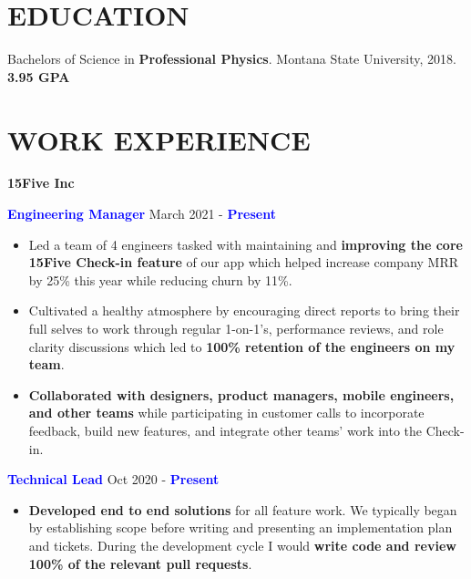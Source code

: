 \documentclass[11pt]{resume}
\begin{document}
    \vspace{-1em}
    \noindent\begin{minipage}[t]{1\textwidth}
      {\section* {\large{EDUCATION}}}
      Bachelors of Science in {\bf Professional Physics}. Montana State University,
      2018.
      {\bf 3.95 GPA}

      {\section* {\large{WORK EXPERIENCE}}}
      \vspace{-.25em}
      {\bf 15Five Inc}
      \vspace{.25em}
      \begin{addmargin}[.5em]{0em}
        {\bf \textcolor{blue}{Engineering Manager}} {\hfill March 2021 - {\bf \textcolor{blue}{Present}}}
        \vspace{-.5em}
        \begin{itemize}
            \setlength\itemsep{-.2em}
            \item {Led a team of 4 engineers tasked with maintaining and {\bf
                  improving the core 15Five Check-in feature} of our app which
                  helped increase company MRR by 25\% this year while reducing churn
                  by 11\%.}
            \item {Cultivated a healthy atmosphere by encouraging direct
                  reports to bring their full selves to work through regular
                  1-on-1's, performance reviews, and role clarity discussions
                  which led to {\bf 100\% retention of the engineers on my team}.}
            \item {{\bf Collaborated with designers, product managers, mobile
                  engineers, and other teams} while participating in customer calls
                  to incorporate feedback, build new features, and integrate other
                  teams' work into the Check-in.}
        \end{itemize}

        {\bf \textcolor{blue}{Technical Lead}} {\hfill Oct 2020 - {\bf \textcolor{blue}{Present}}}
        \vspace{-.5em}
        \begin{itemize}
            \setlength\itemsep{-.2em}
            \item {{\bf Developed end to end solutions} for all feature work. We
                  typically began by establishing scope before writing and
                  presenting an implementation plan and tickets. During the
                  development cycle I would {\bf write code and review
                  100\% of the relevant pull requests}.}


\end{itemize}
\end{addmargin}
\end{minipage}
\end{document}
